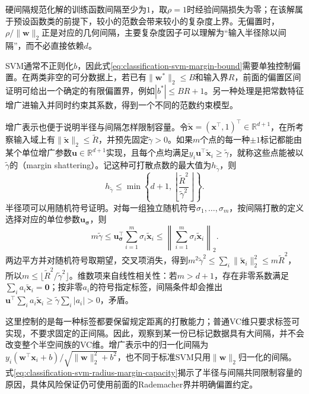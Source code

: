 硬间隔规范化解的训练函数间隔至少为$1$，取$\rho=1$时经验间隔损失为零；在该解属于预设函数类的前提下，较小的范数会带来较小的复杂度上界。无偏置时，$\rho/\lVert\bm{w}\rVert_2$正是对应的几何间隔，主要复杂度因子可以理解为“输入半径除以间隔”，而不必直接依赖$d$。

SVM通常不正则化$b$，因此式\eqref{eq:classification-svm-margin-bound}需要单独控制偏置。在两类非空的可分数据上，若已有$\lVert\bm{w}^{\ast}\rVert_2\le B$和输入界$R$，前面的偏置区间证明可给出一个确定的有限偏置界，例如$|b^{\ast}|\le BR+1$。另一种处理是把常数特征增广进输入并同时约束其系数，得到一个不同的范数约束模型。

增广表示也便于说明半径与间隔怎样限制容量。令$\widetilde{\bm{x}}=(\bm{x}^{\top},1)^{\top}\in\mathbb{R}^{d+1}$，在所考察输入域上有$\lVert\widetilde{\bm{x}}\rVert_2\le\widetilde R$，并预先固定$\widetilde\gamma>0$。如果$m$个点的每一种$\pm1$标记都能由某个单位增广参数$\bm{u}\in\mathbb{R}^{d+1}$实现，且每个点均满足$y_i\bm{u}^{\top}\widetilde{\bm{x}}_i\ge\widetilde\gamma$，就称这些点能被以$\widetilde\gamma$的（margin shattering）。记这种可打散点数的最大值为$h_{\widetilde\gamma}$，则
\begin{equation}
  h_{\widetilde\gamma}
  \le\min\left\{
      d+1,\left\lfloor
        \frac{\widetilde R^2}{\widetilde\gamma^2}
      \right\rfloor
    \right\}.
  \label{eq:classification-svm-radius-margin-capacity}
\end{equation}
半径项可以用随机符号证明。对每一组独立随机符号$\sigma_1,\ldots,\sigma_m$，按间隔打散的定义选择对应的单位参数$\bm{u}_{\bm{\sigma}}$，则
\[
  m\widetilde\gamma
  \le\bm{u}_{\bm{\sigma}}^{\top}
       \sum_{i=1}^m\sigma_i\widetilde{\bm{x}}_i
  \le\left\lVert
       \sum_{i=1}^m\sigma_i\widetilde{\bm{x}}_i
     \right\rVert_2.
\]
两边平方并对随机符号取期望，交叉项消失，得到$m^2\widetilde\gamma^2\le\sum_i\lVert\widetilde{\bm{x}}_i\rVert_2^2\le m\widetilde R^2$，所以$m\le\lfloor\widetilde R^2/\widetilde\gamma^2\rfloor$。维数项来自线性相关性：若$m>d+1$，存在非零系数满足$\sum_i a_i\widetilde{\bm{x}}_i=\bm{0}$；按非零$a_i$的符号指定标签，间隔条件却会推出$\bm{u}^{\top}\sum_i a_i\widetilde{\bm{x}}_i\ge\widetilde\gamma\sum_i|a_i|>0$，矛盾。

这里控制的是每一种标签都要保留规定距离的打散能力；普通VC维只要求标签可实现，不要求固定的正间隔。因此，观察到某一份已标记数据具有大间隔，并不会改变整个半空间族的VC维。增广表示中的归一化间隔为$y_i(\bm{w}^{\top}\bm{x}_i+b)/\sqrt{\lVert\bm{w}\rVert_2^2+b^2}$，也不同于标准SVM只用$\lVert\bm{w}\rVert_2$归一化的间隔。式\eqref{eq:classification-svm-radius-margin-capacity}揭示了半径与间隔共同限制容量的原因，具体风险保证仍可使用前面的Rademacher界并明确偏置约定。

